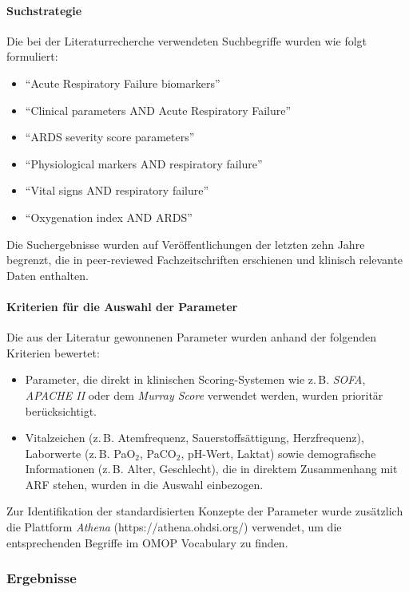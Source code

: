 \documentclass[12pt]{article}
\begin{document}
\paragraph{Suchstrategie}
Die bei der Literaturrecherche verwendeten Suchbegriffe wurden wie folgt formuliert:

\begin{itemize}
  \item ``Acute Respiratory Failure biomarkers''
  \item ``Clinical parameters AND Acute Respiratory Failure''
  \item ``ARDS severity score parameters''
  \item ``Physiological markers AND respiratory failure''
  \item ``Vital signs AND respiratory failure''
  \item ``Oxygenation index AND ARDS''
\end{itemize}

Die Suchergebnisse wurden auf Veröffentlichungen der letzten zehn Jahre begrenzt, die in peer-reviewed Fachzeitschriften erschienen und klinisch relevante Daten enthalten.

\paragraph{Kriterien für die Auswahl der Parameter}
Die aus der Literatur gewonnenen Parameter wurden anhand der folgenden Kriterien bewertet:

\begin{itemize}
  \item Parameter, die direkt in klinischen Scoring-Systemen wie z.\,B. \textit{SOFA}, \textit{APACHE II} oder dem \textit{Murray Score} verwendet werden, wurden prioritär berücksichtigt.
\item Vitalzeichen (z.\,B. Atemfrequenz, Sauerstoffsättigung, Herzfrequenz), Laborwerte (z.\,B. PaO$_2$, PaCO$_2$, pH-Wert, Laktat) sowie demografische Informationen (z.\,B. Alter, Geschlecht), die in direktem Zusammenhang mit ARF stehen, wurden in die Auswahl einbezogen.


\end{itemize}

Zur Identifikation der standardisierten Konzepte der Parameter wurde zusätzlich die Plattform \textit{Athena} (https://athena.ohdsi.org/) verwendet, um die entsprechenden Begriffe im OMOP Vocabulary zu finden.
\subsubsection{Ergebnisse}
\end{document}
